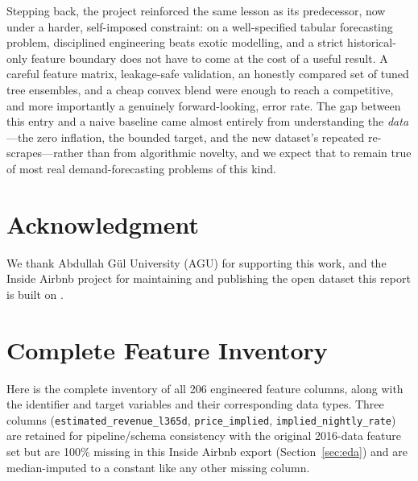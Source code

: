 \documentclass[journal]{IEEEtran}
\begin{document}
Stepping back, the project reinforced the same lesson as its predecessor, now
under a harder, self-imposed constraint: on a well-specified tabular
forecasting problem, disciplined engineering beats exotic modelling, and a
strict historical-only feature boundary does not have to come at the cost of a
useful result. A careful feature matrix, leakage-safe validation, an honestly
compared set of tuned tree ensembles, and a cheap convex blend were enough to
reach a competitive, and more importantly a genuinely forward-looking, error
rate. The gap between this entry and a naive baseline came almost entirely from
understanding the \emph{data}---the zero inflation, the bounded target, and the
new dataset's repeated re-scrapes---rather than from algorithmic novelty, and we
expect that to remain true of most real demand-forecasting problems of this
kind.

\section*{Acknowledgment}
We thank Abdullah G\"ul University (AGU) for supporting this work, and the
Inside Airbnb project for maintaining and publishing the open dataset this
report is built on \cite{insideairbnb}.




\appendices
\section{Complete Feature Inventory}
\label{app:allfeatures_table}
Here is the complete inventory of all 206 engineered feature columns, along
with the identifier and target variables and their corresponding data types.
Three columns (\texttt{estimated\_revenue\_l365d}, \texttt{price\_implied},
\texttt{implied\_nightly\_rate}) are retained for pipeline/schema consistency
with the original 2016-data feature set but are 100\% missing in this Inside
Airbnb export (Section~\ref{sec:eda}) and are median-imputed to a constant like
any other missing column.
\end{document}
